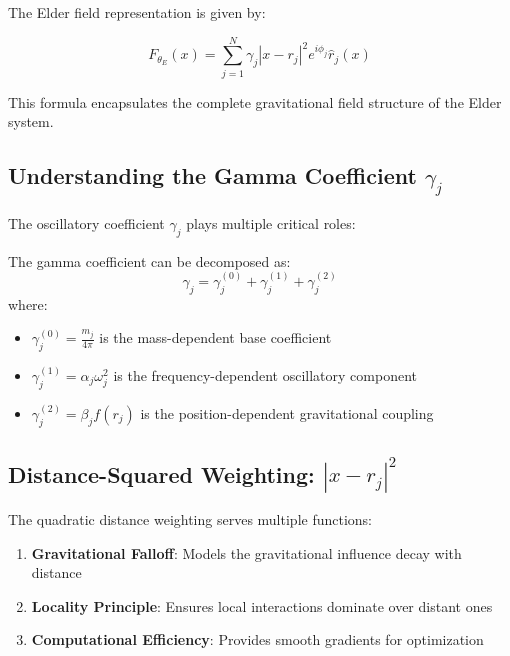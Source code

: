 The Elder field representation is given by:

\begin{equation}
F_{\theta_E}(x) = \sum_{j=1}^N \gamma_j |x - r_j|^2 e^{i\phi_j} \hat{r}_j(x)
\end{equation}

This formula encapsulates the complete gravitational field structure of the Elder system.

\subsection{Understanding the Gamma Coefficient $\gamma_j$}

The oscillatory coefficient $\gamma_j$ plays multiple critical roles:

\begin{definition}
The gamma coefficient can be decomposed as:
\begin{equation}
\gamma_j = \gamma_j^{(0)} + \gamma_j^{(1)} + \gamma_j^{(2)}
\end{equation}
where:
\begin{itemize}
    \item $\gamma_j^{(0)} = \frac{m_j}{4\pi}$ is the mass-dependent base coefficient
    \item $\gamma_j^{(1)} = \alpha_j \omega_j^2$ is the frequency-dependent oscillatory component
    \item $\gamma_j^{(2)} = \beta_j f(r_j)$ is the position-dependent gravitational coupling
\end{itemize}
\end{definition}

\subsection{Distance-Squared Weighting: $|x - r_j|^2$}

The quadratic distance weighting serves multiple functions:

\begin{enumerate}
    \item \textbf{Gravitational Falloff}: Models the gravitational influence decay with distance
    \item \textbf{Locality Principle}: Ensures local interactions dominate over distant ones
    \item \textbf{Computational Efficiency}: Provides smooth gradients for optimization
\end{enumerate}

